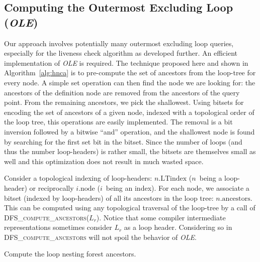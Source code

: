\subsection{Computing the Outermost Excluding Loop (\textit{OLE})}
\label{sec:ole}
Our approach involves potentially many outermost excluding loop queries, especially for the liveness check algorithm as developed further.
An efficient implementation of \textit{OLE} is required.
The technique proposed here and shown in Algorithm~\ref{alg:hnca} is to pre-compute the set of ancestors from the loop-tree for every node.
A simple set operation can then find the node we are looking for:
the ancestors of the definition node are removed from the ancestors of the query point.
From the remaining ancestors, we pick the shallowest.
Using bitsets for encoding the set of ancestors of a given node, indexed with a topological order of the loop tree, this operations are easily implemented.
The removal is a bit inversion followed by a bitwise ``and'' operation, and the shallowest node is found by searching for the first set bit in the bitset.
Since the number of loops (and thus the number loop-headers) is rather small, the bitsets are themselves small as well and this optimization does not result in much wasted space.

Consider a topological indexing of loop-headers: $n.\textrm{LTindex}$ ($n$~being a loop-header) or reciprocally $i.\textrm{node}$ ($i$~being an index).
For each node, we associate a bitset (indexed by loop-headers) of all its ancestors in the loop tree:
$n.\textrm{ancestors}$.
This can be computed using any topological traversal of the loop-tree by a call of \textsc{DFS\_compute\_ancestors}($L_r$).
Notice that some compiler intermediate representations sometimes consider $L_r$ as a loop header.
Considering so in \textsc{DFS\_compute\_ancestors} will not spoil the behavior of \@\textit{OLE}.

\begin{algorithm}
\caption{Compute the loop nesting forest ancestors.}
\label{alg:ancestors}
\end{algorithm}

